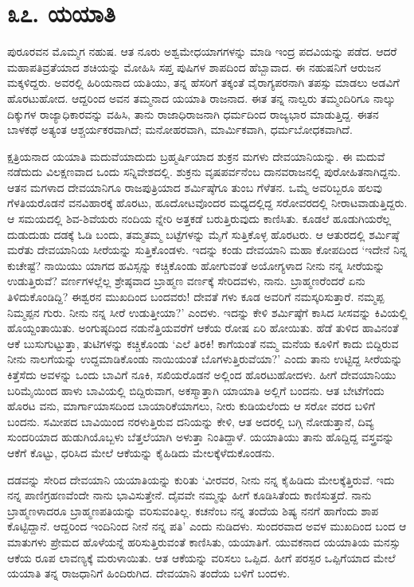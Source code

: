 
\chapter{೩೭. ಯಯಾತಿ}

ಪುರೂರವನ ಮೊಮ್ಮಗ ನಹುಷ. ಆತ ನೂರು ಅಶ್ವಮೇಧಯಾಗಗಳನ್ನು ಮಾಡಿ ಇಂದ್ರ ಪದವಿಯನ್ನು ಪಡೆದ. ಆದರೆ ಮಹಾಪತಿವ್ರತೆಯಾದ ಶಚಿಯನ್ನು ಮೋಹಿಸಿ ಸಪ್ತ ಪುಷಿಗಳ ಶಾಪದಿಂದ ಹೆಬ್ಬಾವಾದ. ಈ ನಹುಷನಿಗೆ ಆರುಜನ ಮಕ್ಕಳಿದ್ದರು. ಅವರಲ್ಲಿ ಹಿರಿಯನಾದ ಯತಿಯು, ತನ್ನ ಹೆಸರಿಗೆ ತಕ್ಕಂತೆ ವೈರಾಗ್ಯಪರನಾಗಿ ತಪಸ್ಸು ಮಾಡಲು ಅಡವಿಗೆ ಹೊರಟುಹೋದ. ಆದ್ದರಿಂದ ಅವನ ತಮ್ಮನಾದ ಯಯಾತಿ ರಾಜನಾದ. ಈತ ತನ್ನ ನಾಲ್ವರು ತಮ್ಮಂದಿರಿಗೂ ನಾಲ್ಕು ದಿಕ್ಕುಗಳ ರಾಜ್ಯಾಧಿಕಾರವನ್ನು ವಹಿಸಿ, ತಾನು ರಾಜಾಧಿರಾಜನಾಗಿ ಧರ್ಮದಿಂದ ರಾಜ್ಯಭಾರ ಮಾಡುತ್ತಿದ್ದ. ಈತನ ಬಾಳಕಥೆ ಅತ್ಯಂತ ಆಶ್ಚರ್ಯಕರವಾಗಿದೆ; ಮನೋಹರವಾಗಿ, ಮಾರ್ಮಿಕವಾಗಿ, ಧರ್ಮಬೋಧಕವಾಗಿದೆ.

ಕ್ಷತ್ರಿಯನಾದ ಯಯಾತಿ ಮದುವೆಯಾದುದು ಬ್ರಹ್ಮರ್ಷಿಯಾದ ಶುಕ್ರನ ಮಗಳು ದೇವಯಾನಿಯನ್ನು. ಈ ಮದುವೆ ನಡೆದುದು ವಿಲಕ್ಷಣವಾದ ಒಂದು ಸನ್ನಿವೇಶದಲ್ಲಿ. ಶುಕ್ರನು ವೃಷಪರ್ವನೆಂಬ ದಾನವರಾಜನಲ್ಲಿ ಪುರೋಹಿತನಾಗಿದ್ದನು. ಆತನ ಮಗಳಾದ ದೇವಯಾನಿಗೂ ರಾಜಪುತ್ರಿಯಾದ ಶರ್ಮಿಷ್ಠೆಗೂ ತುಂಬ ಗೆಳೆತನ. ಒಮ್ಮೆ ಅವರಿಬ್ಬರೂ ಹಲವು ಗೆಳತಿಯರೊಡನೆ ವನವಿಹಾರಕ್ಕೆ ಹೊರಟು, ಹೂದೋಟವೊಂದರ ಮಧ್ಯದಲ್ಲಿದ್ದ ಸರೋವರದಲ್ಲಿ ನೀರಾಟವಾಡುತ್ತಿದ್ದರು. ಆ ಸಮಯದಲ್ಲಿ ಶಿವ-ಶಿವೆಯರು ನಂದಿಯ ನ್ನೇರಿ ಅತ್ತಕಡೆ ಬರುತ್ತಿರುವುದು ಕಾಣಿಸಿತು. ಕೂಡಲೆ ಹೂಡುಗಿಯರೆಲ್ಲ ದುಡುದುಡು ದಡಕ್ಕೆ ಓಡಿ ಬಂದು, ತಮ್ಮತಮ್ಮ ಬಟ್ಟೆಗಳನ್ನು ಮೈಗೆ ಸುತ್ತಿಕೊಳ್ಳ ಹೊರಟರು. ಆ ಆತುರದಲ್ಲಿ ಶರ್ಮಿಷ್ಠೆ ಮರೆತು ದೇವಯಾನಿಯ ಸೀರೆಯನ್ನು ಸುತ್ತಿಕೊಂಡಳು. ಇದನ್ನು ಕಂಡು ದೇವಯಾನಿ ಮಹಾ ಕೋಪದಿಂದ ‘ಇದೇನೆ ನಿನ್ನ ಕುಚೇಷ್ಟೆ? ನಾಯಿಯು ಯಾಗದ ಹವಿಸ್ಸನ್ನು ಕಚ್ಚಿಕೊಂಡು ಹೋಗುವಂತೆ ಅಯೋಗ್ಯಳಾದ ನೀನು ನನ್ನ ಸೀರೆಯನ್ನು ಉಡುತ್ತಿರುವೆ? ವರ್ಣಗಳಲ್ಲೆಲ್ಲ ಶ್ರೇಷ್ಠವಾದ ಬ್ರಾಹ್ಮಣ ವರ್ಣಕ್ಕೆ ಸೇರಿದವಳು, ನಾನು. ಬ್ರಾಹ್ಮಣರೆಂದರೆ ಏನು ತಿಳಿದುಕೊಂಡಿದ್ದಿ? ಈಶ್ವರನ ಮುಖದಿಂದ ಬಂದವರು! ದೇವತೆ ಗಳು ಕೂಡ ಅವರಿಗೆ ನಮಸ್ಕರಿಸುತ್ತಾರೆ. ನಮ್ಮಪ್ಪ ನಿಮ್ಮಪ್ಪನ ಗುರು. ನೀನು ನನ್ನ ಸೀರೆ ಉಡುತ್ತೀಯಾ?’ ಎಂದಳು. ಇದನ್ನು ಕೇಳಿ ಶರ್ಮಿಷ್ಠೆಗೆ ಕಾಸಿದ ಸೀಸವನ್ನು ಕಿವಿಯಲ್ಲಿ ಹೊಯ್ದಂತಾಯಿತು. ಅಂಗುಷ್ಠದಿಂದ ನಡುನೆತ್ತಿಯವರೆಗೆ ಆಕೆಯ ರೋಷ ಏರಿ ಹೋಯಿತು. ಹೆಡೆ ತುಳಿದ ಹಾವಿನಂತೆ ಆಕೆ ಬುಸುಗುಟ್ಟುತ್ತಾ, ತುಟಿಗಳನ್ನು ಕಚ್ಚಿಕೊಂಡು ‘ಎಲೆ ತಿರಕಿ! ಕಾಗೆಯಂತೆ ನಮ್ಮ ಮನೆಯ ಕೂಳಿಗೆ ಕಾದು ಬಿದ್ದಿರುವ ನೀನು ನಾಲಗೆಯನ್ನು ಉದ್ದಮಾಡಿಕೊಂಡು ನಾಯಿಯಂತೆ ಬೊಗಳುತ್ತಿರುವೆಯಾ?’ ಎಂದು ತಾನು ಉಟ್ಟಿದ್ದ ಸೀರೆಯನ್ನು ಕಿತ್ತೆಸೆದು ಅವಳನ್ನು ಒಂದು ಬಾವಿಗೆ ನೂಕಿ, ಸಖಿಯರೊಡನೆ ಅಲ್ಲಿಂದ ಹೊರಟುಹೋದಳು. ಹೀಗೆ ದೇವಯಾನಿಯು ಬರಿಮೈಯಿಂದ ಹಾಳು ಬಾವಿಯಲ್ಲಿ ಬಿದ್ದಿರುವಾಗ, ಅಕಸ್ಮಾತ್ತಾಗಿ ಯಾಯಾತಿ ಅಲ್ಲಿಗೆ ಬಂದನು. ಆತ ಬೇಟೆಗೆಂದು ಹೊರಟ ವನು, ಮಾರ್ಗಾಯಾಸದಿಂದ ಬಾಯಾರಿಕೆಯಾಗಲು, ನೀರು ಕುಡಿಯಲೆಂದು ಆ ಸರೋ ವರದ ಬಳಿಗೆ ಬಂದನು. ಸಮೀಪದ ಬಾವಿಯಿಂದ ನರಳುತ್ತಿರುವ ದನಿಯನ್ನು ಕೇಳಿ, ಆತ ಅದರಲ್ಲಿ ಬಗ್ಗಿ ನೋಡುತ್ತಾನೆ, ದಿವ್ಯ ಸುಂದರಿಯಾದ ಹುಡುಗಿಯೊಬ್ಬಳು ಬೆತ್ತಲೆಯಾಗಿ ಅಳುತ್ತಾ ನಿಂತಿದ್ದಾಳೆ. ಯಯಾತಿಯು ತಾನು ಹೊದ್ದಿದ್ದ ವಸ್ತ್ರವನ್ನು ಆಕೆಗೆ ಕೊಟ್ಟು, ಧರಿಸಿದ ಮೇಲೆ ಆಕೆಯನ್ನು ಕೈಹಿಡಿದು ಮೇಲಕ್ಕೆಳೆದುಕೊಂಡನು.

ದಡವನ್ನು ಸೇರಿದ ದೇವಯಾನಿ ಯಯಾತಿಯನ್ನು ಕುರಿತು ‘ವೀರವರ, ನೀನು ನನ್ನ ಕೈಹಿಡಿದು ಮೇಲಕ್ಕೆತ್ತಿರುವೆ. ಇದು ನನ್ನ ಪಾಣಿಗ್ರಹಣವೆಂದೇ ನಾನು ಭಾವಿಸುತ್ತೇನೆ. ದೈವವೇ ನಮ್ಮನ್ನು ಹೀಗೆ ಕೂಡಿಸಿತೆಂದು ಕಾಣಿಸುತ್ತದೆ. ನಾನು ಬ್ರಾಹ್ಮಣಳಾದರೂ ಬ್ರಾಹ್ಮಣಪತಿಯನ್ನು ವರಿಸುವಂತಿಲ್ಲ. ಕಚನೆಂಬ ನನ್ನ ತಂದೆಯ ಶಿಷ್ಯ ನನಗೆ ಹಾಗೆಂದು ಶಾಪ ಕೊಟ್ಟಿದ್ದಾನೆ. ಆದ್ದರಿಂದ ಇಂದಿನಿಂದ ನೀನೆ ನನ್ನ ಪತಿ’ ಎಂದು ನುಡಿದಳು. ಸುಂದರವಾದ ಅವಳ ಮುಖದಿಂದ ಬಂದ ಆ ಮಾತುಗಳು ಪ್ರೇಮದ ಹೊಳೆಯನ್ನೆ ಹರಿಸುತ್ತಿರುವಂತೆ ಕಾಣಿಸಿತು, ಯಯಾತಿಗೆ. ಯುವಕನಾದ ಯಯಾತಿಯ ಮನಸ್ಸು ಆಕೆಯ ರೂಪ ಲಾವಣ್ಯಕ್ಕೆ ಮರುಳಾಯಿತು. ಆತ ಆಕೆಯನ್ನು ವರಿಸಲು ಒಪ್ಪಿದ. ಹೀಗೆ ಪರಸ್ಪರ ಒಪ್ಪಿಗೆಯಾದ ಮೇಲೆ ಯಯಾತಿ ತನ್ನ ರಾಜಧಾನಿಗೆ ಹಿಂದಿರುಗಿದ. ದೇವಯಾನಿ ತಂದೆಯ ಬಳಿಗೆ ಬಂದಳು.

